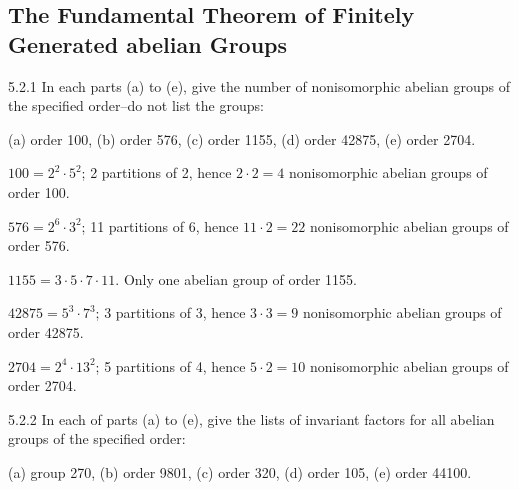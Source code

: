 \subsection{The Fundamental Theorem of Finitely Generated abelian Groups}

\begin{exercise}{5.2.1}
    In each parts (a) to (e), give the number of nonisomorphic abelian groups of the specified order--do not list the groups:

    \noindent (a) order 100, \quad (b) order 576, \quad (c) order 1155, \quad (d) order 42875, \quad (e) order 2704.
\end{exercise}

\begin{solenum}
    \item $100 = 2^2 \cdot 5^2$; 2 partitions of 2, hence $2 \cdot 2 = 4$ nonisomorphic abelian groups of order 100.
    \item $576 = 2^6 \cdot 3^2$; 11 partitions of 6, hence $11 \cdot 2 = 22$ nonisomorphic abelian groups of order 576.
    \item $1155 = 3 \cdot 5 \cdot 7 \cdot 11$.
	Only one abelian group of order 1155.
    \item $42875 = 5^3 \cdot 7^3$; 3 partitions of 3, hence $3 \cdot 3 = 9$ nonisomorphic abelian groups of order 42875.
    \item $2704 = 2^4 \cdot 13^2$; 5 partitions of 4, hence $5 \cdot 2 = 10$ nonisomorphic abelian groups of order 2704.
\end{solenum}

\begin{exercise}{5.2.2}
    In each of parts (a) to (e), give the lists of invariant factors for all abelian groups of the specified order:

    \noindent (a) group 270, \quad (b) order 9801, \quad (c) order 320, \quad (d) order 105, \quad (e) order 44100.
\end{exercise}

